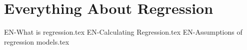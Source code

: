 \chapterspaceabove{6.75cm} %
\chapterspacebelow{7.25cm} %


\chapter{Everything About Regression}

{EN-What is regression.tex}
{EN-Calculating Regression.tex}
{EN-Assumptions of regression models.tex}
